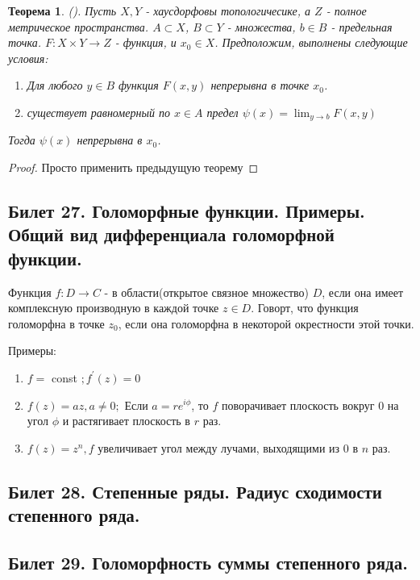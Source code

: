 \documentclass[a4paper]{article}
\theoremstyle{indented}
\newtheorem{theorem}{Теорема}
\theoremstyle{definition}
\theoremstyle{remark}
\DeclareMathOperator{\ra}{\rightarrow}
\begin{document}
\begin{theorem}
    (). Пусть $X, Y$ - хаусдорфовы топологичесике, а $Z$ - полное метрическое пространства. $A \subset X$, $B \subset Y$ - множества, $b \in B$ - предельная точка. $F: X \times Y \ra Z$ - функция, и $x_0 \in X$. Предположим, выполнены следующие условия:
    \begin{enumerate}
        \item Для любого $y \in B$ функция $F(x, y)$ непрерывна в точке $x_0$.
        \item существует равномерный по $x \in A$ предел $\psi(x)=\lim_{y \ra b} F(x, y)$
    \end{enumerate}
    Тогда $\psi(x)$ непрерывна в $x_0$.
\end{theorem}
\begin{proof}
    Просто применить предыдущую теорему
\end{proof}

\subsection{Билет 27. Голоморфные функции. Примеры. Общий вид дифференциала голоморфной функции.}%

Функция $f:D \ra C$ -  в области(открытое связное множество) $D$, если она имеет комплексную производную в каждой точке $z \in D$. Говорт, что функция голоморфна в точке $z_0$, если она голоморфна в некоторой окрестности этой точки.

Примеры: 
\begin{enumerate}
    \item $f = $ const $; f^{'}(z) = 0$ 
    \item $f(z) = az, a \neq 0;$ Если $a = re^{i\phi}$, то $f$ поворачивает плоскость вокруг 0 на угол $\phi$ и растягивает плоскость в $r$ раз.
    \item $f(z) = z^n, f$ увеличивает угол между лучами, выходящими из 0 в $n$ раз.
\end{enumerate}

\subsection{Билет 28. Степенные ряды. Радиус сходимости степенного ряда.}%


\subsection{Билет 29. Голоморфность суммы степенного ряда.}%
\end{document}
